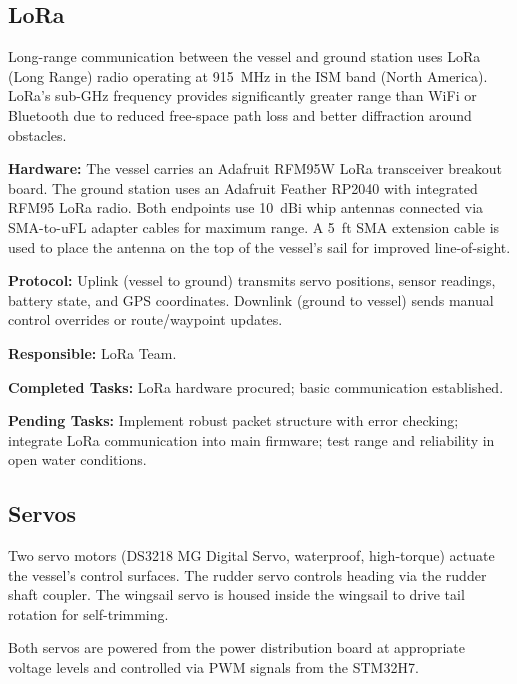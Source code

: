 
\subsection{LoRa}

Long-range communication between the vessel and ground station uses LoRa (Long Range) radio operating at 915~MHz in the ISM band (North America). LoRa's sub-GHz frequency provides significantly greater range than WiFi or Bluetooth due to reduced free-space path loss and better diffraction around obstacles.

\textbf{Hardware:} The vessel carries an Adafruit RFM95W LoRa transceiver breakout board. The ground station uses an Adafruit Feather RP2040 with integrated RFM95 LoRa radio. Both endpoints use 10~dBi whip antennas connected via SMA-to-uFL adapter cables for maximum range. A 5~ft SMA extension cable is used to place the antenna on the top of the vessel's sail for improved line-of-sight.

\textbf{Protocol:} Uplink (vessel to ground) transmits servo positions, sensor readings, battery state, and GPS coordinates. Downlink (ground to vessel) sends manual control overrides or route/waypoint updates.

\textbf{Responsible:} LoRa Team.

\textbf{Completed Tasks:} LoRa hardware procured; basic communication established.

\textbf{Pending Tasks:} Implement robust packet structure with error checking; integrate LoRa communication into main firmware; test range and reliability in open water conditions.


\subsection{Servos}

Two servo motors (DS3218 MG Digital Servo, waterproof, high-torque) actuate the vessel's control surfaces. The rudder servo controls heading via the rudder shaft coupler. The wingsail servo is housed inside the wingsail to drive tail rotation for self-trimming.

Both servos are powered from the power distribution board at appropriate voltage levels and controlled via PWM signals from the STM32H7.

